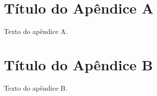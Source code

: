 
\begin{apendicesenv}
	
	\partapendices
	
	\chapter{Título do Apêndice A}
	
	Texto do apêndice A.
	
	\chapter{Título do Apêndice B}
	
	Texto do apêndice B.
	
\end{apendicesenv}
